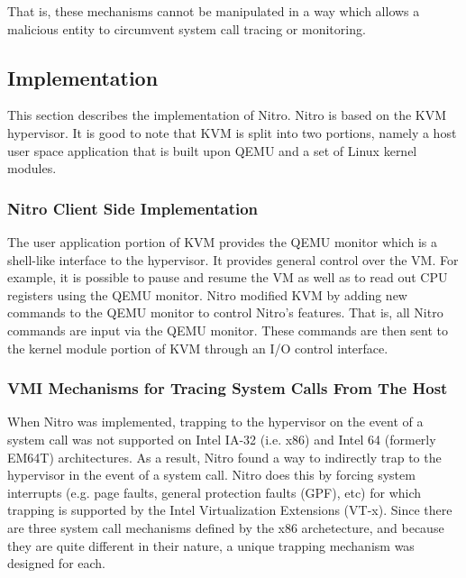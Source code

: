 \documentclass{report}
\begin{document}
\begin{spacing}{1.5}
{That is, these mechanisms cannot be manipulated in a way which allows a malicious
entity to circumvent system call tracing or monitoring.
\newline
}


\subsection{Implementation}

{\large
This section describes the implementation of Nitro. Nitro is based on the KVM hypervisor. It is good to note that KVM is split into two portions, namely a host user space application that is built upon QEMU and a set of Linux kernel modules.
\newline
}

\subsubsection{Nitro Client Side Implementation}

{\large
The user application portion of KVM provides the QEMU monitor which is a shell-like interface to the hypervisor. It provides general control over the VM. For example, it is possible to pause and resume the VM as well as to read out CPU registers using the QEMU monitor. Nitro modified KVM by adding new commands to the QEMU monitor to control Nitro’s features. That is, all Nitro commands are input via the QEMU monitor. These commands are then sent to the kernel module portion of KVM through an I/O control interface.
}


\subsubsection{VMI Mechanisms for Tracing System Calls From The Host}

{\large
When Nitro was implemented, trapping to the hypervisor on the event of a system call was not supported on Intel IA-32 (i.e. x86) and Intel 64 (formerly EM64T) architectures. As a result, Nitro found a way to indirectly trap to the hypervisor in the event of a system call. Nitro does this by forcing system interrupts (e.g. page faults, general protection faults (GPF), etc) for which trapping is supported by the Intel Virtualization Extensions (VT-x). Since there are three system call mechanisms defined by the x86 archetecture, and because they are quite different in their nature, a unique trapping mechanism was designed for each.
\newline
}



\end{spacing}
\end{document}
